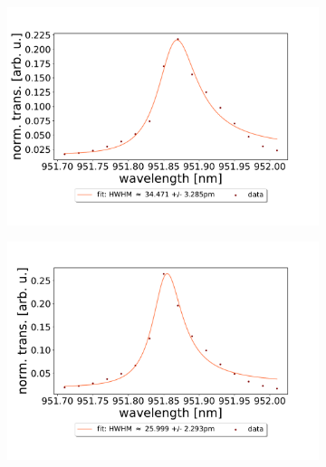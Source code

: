 \begin{figure}[h!]
    \centering
    \begin{subfigure}[b]{0.49\textwidth}
        \includegraphics[width=\textwidth]{figures/results/double fano fits/1000um_M3:M5_fit_1.pdf}
        \caption{}
        \label{fig:1000um_M3:M5_fit_1}
    \end{subfigure}
    \begin{subfigure}[b]{0.49\textwidth}
        \includegraphics[width=\textwidth]{figures/results/double fano fits/1000um_M3:M5_fit_2.pdf}
        \caption{}
        \label{fig:1000um_M3:M5_fit_2}
    \end{subfigure}
    \begin{subfigure}[b]{0.49\textwidth}

\end{subfigure}
\end{figure}
